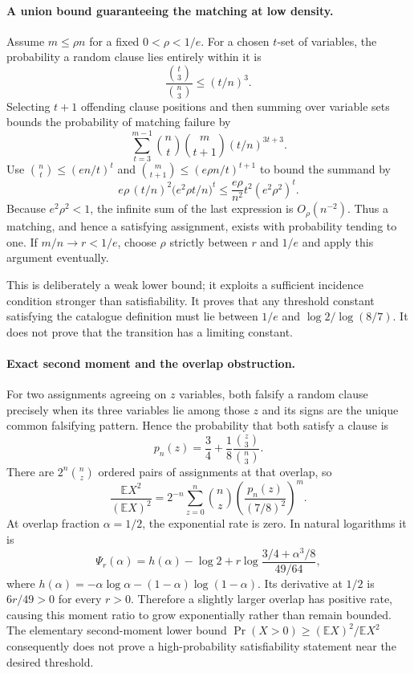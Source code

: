 \documentclass[11pt]{article}
\begin{document}
\paragraph{A union bound guaranteeing the matching at low density.}
Assume $m\le\rho n$ for a fixed $0<\rho<1/e$. For a chosen $t$-set of variables, the probability a random clause lies entirely within it is
\[
\frac{\binom t3}{\binom n3}\le(t/n)^3.
\]
Selecting $t+1$ offending clause positions and then summing over variable sets bounds the probability of matching failure by
\[
\sum_{t=3}^{m-1}\binom nt\binom m{t+1}(t/n)^{3t+3}.
\]
Use $\binom nt\le(en/t)^t$ and $\binom m{t+1}\le(e\rho n/t)^{t+1}$ to bound the summand by
\[
e\rho\,(t/n)^2\bigl(e^2\rho t/n\bigr)^t
\le\frac{e\rho}{n^2}t^2(e^2\rho^2)^t.
\]
Because $e^2\rho^2<1$, the infinite sum of the last expression is $O_\rho(n^{-2})$. Thus a matching, and hence a satisfying assignment, exists with probability tending to one. If $m/n\to r<1/e$, choose $\rho$ strictly between $r$ and $1/e$ and apply this argument eventually.

This is deliberately a weak lower bound; it exploits a sufficient incidence condition stronger than satisfiability. It proves that any threshold constant satisfying the catalogue definition must lie between $1/e$ and $\log2/\log(8/7)$. It does not prove that the transition has a limiting constant.

\paragraph{Exact second moment and the overlap obstruction.}
For two assignments agreeing on $z$ variables, both falsify a random clause precisely when its three variables lie among those $z$ and its signs are the unique common falsifying pattern. Hence the probability that both satisfy a clause is
\[
p_n(z)=\frac34+\frac18\frac{\binom z3}{\binom n3}.
\]
There are $2^n\binom nz$ ordered pairs of assignments at that overlap, so
\[
\frac{\mathbb EX^2}{(\mathbb EX)^2}
=2^{-n}\sum_{z=0}^n\binom nz
 \left(\frac{p_n(z)}{(7/8)^2}\right)^m.
\]
At overlap fraction $\alpha=1/2$, the exponential rate is zero. In natural logarithms it is
\[
\Psi_r(\alpha)=h(\alpha)-\log2+
r\log\frac{3/4+\alpha^3/8}{49/64},
\]
where $h(\alpha)=-\alpha\log\alpha-(1-\alpha)\log(1-\alpha)$. Its derivative at $1/2$ is $6r/49>0$ for every $r>0$. Therefore a slightly larger overlap has positive rate, causing this moment ratio to grow exponentially rather than remain bounded. The elementary second-moment lower bound $\Pr(X>0)\ge(\mathbb EX)^2/\mathbb EX^2$ consequently does not prove a high-probability satisfiability statement near the desired threshold.
\end{document}
